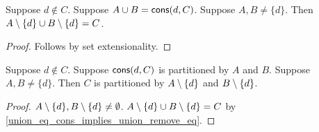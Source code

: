 \begin{proposition}\label{union_eq_cons_implies_union_remove_eq}
    Suppose $d\notin C$.
    Suppose $A\union B = \cons{d}{C}$.
    Suppose $A, B\neq \{d\}$.
    Then $\remove{d}{A}\union \remove{d}{B} = C$.
\end{proposition}
\begin{proof}
    Follows by set extensionality.
\end{proof}

\begin{proposition}\label{bipartitions_cons}
    Suppose $d\notin C$.
    Suppose $\cons{d}{C}$ is partitioned by $A$ and $B$.
    Suppose $A, B\neq \{d\}$.
    Then $C$ is partitioned by $\remove{d}{A}$ and $\remove{d}{B}$.
\end{proposition}
\begin{proof}
    $\remove{d}{A},\remove{d}{B}\neq\emptyset$.
    $\remove{d}{A}\union \remove{d}{B} = C$ by \cref{union_eq_cons_implies_union_remove_eq}.
\end{proof}

